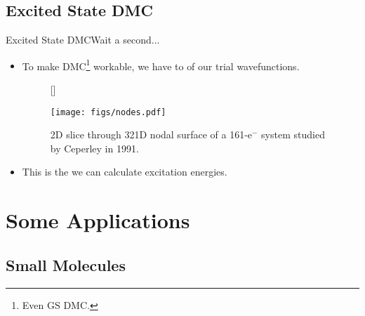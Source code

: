 \documentclass[12pt, pdf, hyperref={draft}, usenames, dvipsnames]{beamer}
\newcommand{\red}[1]{{\bf\color{LancsRed}{#1}}}
\newcommand{\blue}[1]{{\bf\color{NavyBlue}{#1}}}
\newcommand{\green}[1]{{\bf\color{ForestGreen}{#1}}}
\begin{document}
\subsection{Excited State DMC}


\begin{frame}{Excited State DMC}{Wait a second...}
  \begin{itemize}
    \item To make DMC\footnote{Even GS DMC.} workable, we have to \red{fix}
    \blue{the} \green{nodes} of our trial wavefunctions.
    \begin{figure}[H]
      [\FBwidth]
      {\caption{2D slice through 321D nodal surface of a 161-e$^-$ system
      studied by Ceperley in 1991.}\label{fig:nodes}}
      {\texttt{[image: figs/nodes.pdf]}}
    \end{figure}
    \item This is the \blue{only way} we can calculate excitation energies.
  \end{itemize}
\end{frame}



\section{Some Applications}
\subsection{Small Molecules} %
\end{document}
